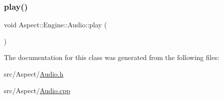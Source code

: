 \mbox{\label{class_aspect_1_1_engine_1_1_audio_aa5902d97e785ed834b24f2b4fa8abde6}} 
\subsubsection{\texorpdfstring{play()}{play()}\hspace{0.1cm}{\footnotesize\ttfamily [2/2]}}
{\footnotesize\ttfamily void Aspect\+::\+Engine\+::\+Audio\+::play (\begin{DoxyParamCaption}{ }\end{DoxyParamCaption})}



The documentation for this class was generated from the following files\+:\begin{DoxyCompactItemize}
\item 
src/\+Aspect/\mbox{\hyperlink{_audio_8h}{Audio.\+h}}\item 
src/\+Aspect/\mbox{\hyperlink{_audio_8cpp}{Audio.\+cpp}}\end{DoxyCompactItemize}
